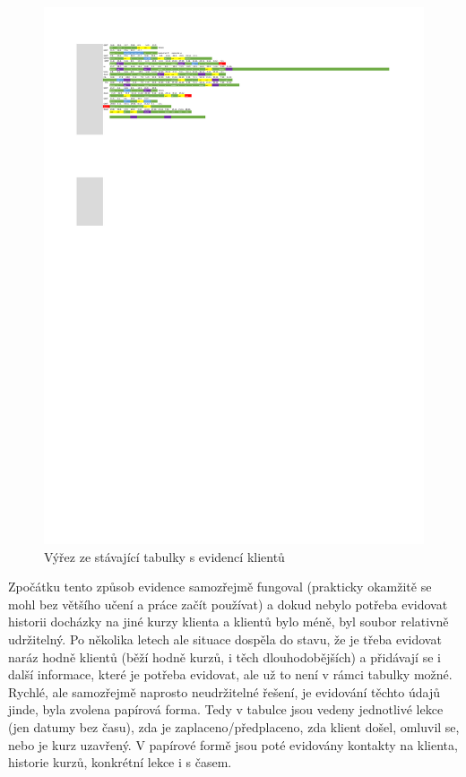     \begin{figure}\centering
    	\includegraphics[width=1\textwidth]{img/excel}
    	\caption{Výřez ze stávající tabulky s evidencí klientů}\label{fig:excel}
    \end{figure}
    
    Zpočátku tento způsob evidence samozřejmě fungoval (prakticky okamžitě se mohl bez většího učení a práce začít používat) a dokud nebylo potřeba evidovat historii docházky na jiné kurzy klienta a klientů bylo méně, byl soubor relativně udržitelný. Po několika letech ale situace dospěla do stavu, že je třeba evidovat naráz hodně klientů (běží hodně kurzů, i těch dlouhodobějších) a přidávají se i další informace, které je potřeba evidovat, ale už to není v rámci tabulky možné. Rychlé, ale samozřejmě naprosto neudržitelné řešení, je evidování těchto údajů jinde, byla zvolena papírová forma. Tedy v tabulce jsou vedeny jednotlivé lekce (jen datumy bez času), zda je zaplaceno/předplaceno, zda klient došel, omluvil se, nebo je kurz uzavřený. V papírové formě jsou poté evidovány kontakty na klienta, historie kurzů, konkrétní lekce i s časem.
    
